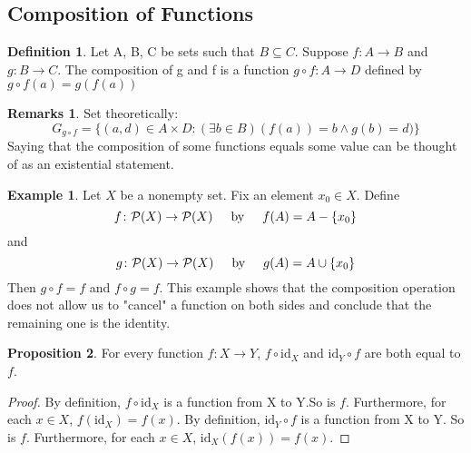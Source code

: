\documentclass[14pt]{article}
\theoremstyle{definition}
\newtheorem*{remark}{Remarks}
\newtheorem*{example}{Example}
\newtheorem{definition}{Definition}[subsection]
\newtheorem{proposition}[definition]{Proposition}
\begin{document}
\subsection{Composition of Functions}
\begin{definition}
    Let A, B, C be sets such that $B\subseteq C$. Suppose $f\colon A \rightarrow B $ and $g\colon B\rightarrow C$. The composition of g and f is a function $g\circ f\colon A\rightarrow D$ defined by $g\circ f(a)=g(f(a))$
\end{definition}

\begin{remark}  Set theoretically:
\begin{equation*}
    G_{g\circ f}=\{(a,d)\in A \times D \colon (\exists b\in B )(f(a))=b\wedge g(b)=d)\}
\end{equation*}
Saying that the composition of some functions equals some value can be thought of as an existential statement. 
\end{remark}

 

\begin{example}
  Let $X $ be a nonempty set. Fix an element $x_0\in X$. Define
  \begin{equation*}
      f\colon \mathcal{P} (X)\rightarrow \mathcal{P} (X)  \hspace{0.5cm} \mathrm{ by } \hspace{0.5cm} f(A)=A-\{x_0\}
  \end{equation*}
  and
  \begin{equation*}
      g\colon \mathcal{P}(X)\rightarrow \mathcal{P} (X) \hspace{0.5cm} \mathrm{ by } \hspace{0.5cm} g(A)=A\cup\{x_0\}
  \end{equation*}
  Then $g\circ f=f$ and $f\circ g=f $. This example shows that the composition operation does not allow us to "cancel" a function on both sides and conclude that the remaining one is the identity. 
\end{example}

\vspace{2mm} %

\begin{proposition}
     For every function $f\colon X\rightarrow Y$, $f\circ \mathrm{id}_X $ and $\mathrm{id}_Y \circ f$ are both equal to $f$.
\end{proposition}

\begin{proof}
    By definition, $f\circ \mathrm{id}_X$ is a function from X to Y.So is $f$. Furthermore, for each $x\in X$, $f(\mathrm{id}_X)=f(x)$.
    By definition, $\mathrm{id}_Y \circ f$ is a function from X to Y. So  is $f$. Furthermore, for each $x\in X$, $\mathrm{id}_X(f(x))=f(x)$.
\end{proof}
\end{document}
